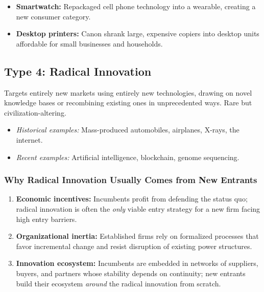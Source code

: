 \documentclass[11pt, letterpaper]{article}
\begin{document}
\begin{itemize}[leftmargin=*]
  \item \textbf{Smartwatch:} Repackaged cell phone technology into a wearable, creating a new consumer category.
  \item \textbf{Desktop printers:} Canon shrank large, expensive copiers into desktop units affordable for small businesses and households.
\end{itemize}

\subsection{Type 4: Radical Innovation}
Targets entirely new markets using entirely new technologies, drawing on novel knowledge bases or recombining existing ones in unprecedented ways. Rare but civilization-altering.

\begin{itemize}[leftmargin=*]
  \item \textit{Historical examples:} Mass-produced automobiles, airplanes, X-rays, the internet.
  \item \textit{Recent examples:} Artificial intelligence, blockchain, genome sequencing.
\end{itemize}

\subsubsection{Why Radical Innovation Usually Comes from New Entrants}
\begin{enumerate}[leftmargin=*, label=\arabic*.]
  \item \textbf{Economic incentives:} Incumbents profit from defending the status quo; radical innovation is often the \textit{only} viable entry strategy for a new firm facing high entry barriers.
  \item \textbf{Organizational inertia:} Established firms rely on formalized processes that favor incremental change and resist disruption of existing power structures.
  \item \textbf{Innovation ecosystem:} Incumbents are embedded in networks of suppliers, buyers, and partners whose stability depends on continuity; new entrants build their ecosystem \textit{around} the radical innovation from scratch.
\end{enumerate}

\newpage

\end{document}
